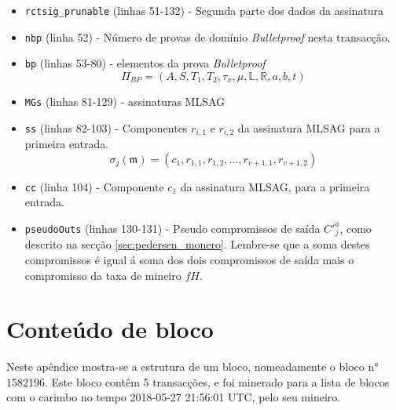 \begin{itemize}
    \item {\tt rctsig\_prunable} (linhas 51-132) - Segunda parte dos dados da assinatura
    \item {\tt nbp} (linha 52) - Número de provas de domínio {\em Bulletproof} nesta transacção.
    \item {\tt bp} (linhas 53-80) - elementos da prova {\em Bulletproof}\vspace{.175cm}
    \[\Pi_{BP} = (A, S, T_1, T_2, \tau_x, \mu, \mathbb{L}, \mathbb{R}, a, b, t)\]
    \item {\tt MGs} (linhas 81-129) - assinaturas MLSAG
    \item {\tt ss} (linhas 82-103) - Componentes \(r_{i,1}\) e \(r_{i,2}\) da assinatura MLSAG para a primeira entrada.\vspace{.175cm}
    \[\sigma_j(\mathfrak{m}) = (c_1, r_{1, 1}, r_{1, 2}, ..., r_{v+1, 1}, r_{v+1, 2})\]
    \item {\tt cc} (linha 104) - Componente \(c_1\) da assinatura MLSAG, para a primeira entrada.
    \item {\tt pseudoOuts} (linhas 130-131) - Pseudo compromissos de saída $C'^a_j$, como descrito na secção \ref{sec:pedersen_monero}. Lembre-se que a soma destes compromissos é igual á soma dos dois compromissos de saída mais o compromisso da taxa de mineiro $f H$. 
\end{itemize}

\chapter{Conteúdo de bloco}
\label{appendix:block-content}

Neste apêndice mostra-se a estrutura de um bloco, nomeadamente o bloco n° 1582196. Este bloco contêm 5 transacções, e foi minerado para a lista de blocos com o carimbo no tempo 2018-05-27 21:56:01 UTC, pelo seu mineiro.

